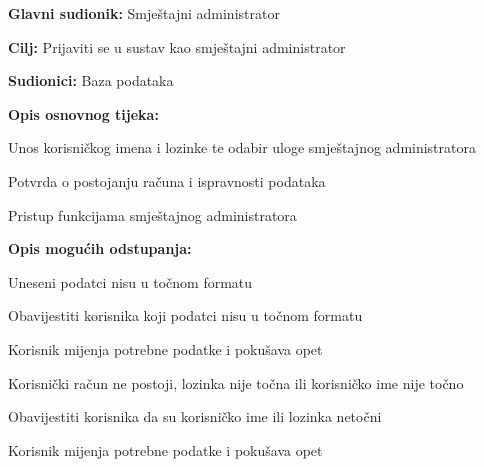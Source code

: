 			\eject 
			

					
					\noindent {}
					\begin{packed_item}
						
						\item \textbf{Glavni sudionik: }Smještajni administrator
						\item  \textbf{Cilj:} Prijaviti se u sustav kao smještajni administrator
						\item  \textbf{Sudionici:} Baza podataka
						\item  \textbf{Opis osnovnog tijeka:}
						
						\item[] \begin{packed_enum}
							
							\item Unos korisničkog imena i lozinke te odabir uloge smještajnog administratora
							\item Potvrda o postojanju računa i ispravnosti podataka
							\item Pristup funkcijama smještajnog administratora
						\end{packed_enum}
						
						\item  \textbf{Opis mogućih odstupanja:}
						
						\item[] \begin{packed_item}
							
							\item[2.a] Uneseni podatci nisu u točnom formatu
							\item[] \begin{packed_enum}
								
								\item Obavijestiti korisnika koji podatci nisu u točnom formatu
								\item Korisnik mijenja potrebne podatke i pokušava opet
								
							\end{packed_enum}
							\item[2.b] Korisnički račun ne postoji, lozinka nije točna ili korisničko ime nije točno
							\item[] \begin{packed_enum}
								
								\item Obavijestiti korisnika da su korisničko ime ili lozinka netočni
								\item Korisnik mijenja potrebne podatke i pokušava opet
								
							\end{packed_enum}

							
						\end{packed_item}
					\end{packed_item}
				
